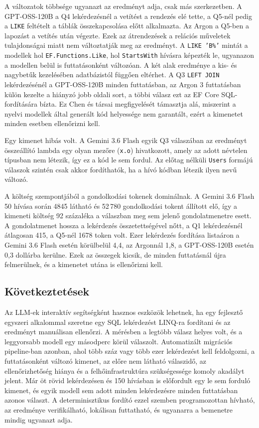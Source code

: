 \documentclass[a4paper,12pt]{article}
\begin{document}
A változatok többsége ugyanazt az eredményt adja, csak más szerkezetben. A GPT-OSS-120B a Q4 lekérdezésnél a vetítést a rendezés elé tette, a Q5-nél pedig a \texttt{LIKE} feltételt a táblák összekapcsolása előtt alkalmazta. Az Argon a Q5-ben a lapozást a vetítés után végezte. Ezek az átrendezések a relációs műveletek tulajdonságai miatt nem változtatják meg az eredményt. A \texttt{LIKE 'B\%'} mintát a modellek hol \texttt{EF.Functions.Like}, hol \texttt{StartsWith} hívásra képezték le, ugyanazon a modellen belül is futtatásonként változóan. A két alak eredménye a kis- és nagybetűk kezelésében adatbázistól függően eltérhet. A Q3 \texttt{LEFT JOIN} lekérdezésénél a GPT-OSS-120B minden futtatásban, az Argon 3 futtatásban külön kezelte a hiányzó jobb oldali sort, a többi válasz ezt az EF Core SQL-fordítására bízta. Ez Chen és társai \cite{chen2021codex} megfigyelését támasztja alá, miszerint a nyelvi modellek által generált kód helyessége nem garantált, ezért a kimenetet minden esetben ellenőrizni kell.

Egy kimenet hibás volt. A Gemini 3.6 Flash egyik Q3 válaszában az eredményt összeállító lambda egy olyan mezőre (\texttt{x.o}) hivatkozott, amely az adott névtelen típusban nem létezik, így ez a kód le sem fordul. Az előtag nélküli \texttt{Users} formájú válaszok szintén csak akkor fordíthatók, ha a hívó kódban létezik ilyen nevű változó.

A költség szempontjából a gondolkodási tokenek dominálnak. A Gemini 3.6 Flash 50 hívása során 4845 látható és 52\,780 gondolkodási tokent állított elő, így a kimeneti költség 92 százaléka a válaszban meg sem jelenő gondolatmenetre esett. A gondolatmenet hossza a lekérdezés összetettségével nőtt, a Q1 lekérdezésnél átlagosan 415, a Q5-nél 1678 token volt. Ezer lekérdezés fordítása listaáron a Gemini 3.6 Flash esetén körülbelül 4,4, az Argonnál 1,8, a GPT-OSS-120B esetén 0,3 dollárba kerülne. Ezek az összegek kicsik, de minden futtatásnál újra felmerülnek, és a kimenetet utána is ellenőrizni kell.

\subsection{Következtetések}

Az LLM-ek interaktív segítségként hasznos eszközök lehetnek, ha egy fejlesztő egyszeri alkalommal szeretne egy SQL lekérdezést LINQ-ra fordítani és az eredményt manuálisan ellenőrzi. A mérésben a legtöbb válasz helyes volt, és a leggyorsabb modell egy másodperc körül válaszolt. Automatizált migrációs pipeline-ban azonban, ahol több száz vagy több ezer lekérdezést kell feldolgozni, a futtatásonként változó kimenet, az előre nem látható válaszidő, az ellenőrizhetőség hiánya és a felhőinfrastruktúra szükségessége komoly akadályt jelent. Már öt rövid lekérdezésen és 150 hívásban is előfordult egy le sem forduló kimenet, és egyik modell sem adott minden lekérdezésre minden futtatásban azonos választ. A determinisztikus fordító ezzel szemben programozottan hívható, az eredménye verifikálható, lokálisan futtatható, és ugyanarra a bemenetre mindig ugyanazt adja.
\end{document}
